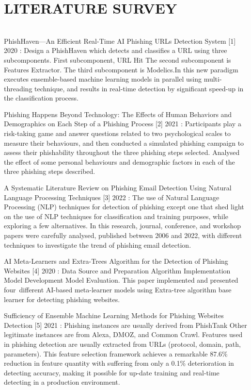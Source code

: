\chapter{LITERATURE SURVEY}
\thispagestyle{empty}
\\
\hspace{.2cm} PhishHaven—An Efficient Real-Time AI Phishing URLs Detection System
[1] 2020 : Design a PhishHaven which detects and classifies a URL using three subcomponents.
First subcomponent, URL Hit 
The second subcomponent is Features Extractor.
The third subcomponent is Modelics.In this new paradigm executes ensemble-based machine learning models in parallel using multi-threading technique, and results in real-time detection by significant speed-up in the classification process. 

\hspace{.2cm} Phishing Happens Beyond Technology: The Effects of Human Behaviors and Demographics on Each Step of a Phishing Process
[2] 2021 : Participants play a risk-taking game and answer questions related to two psychological scales to measure their behaviours, and then conducted a simulated phishing campaign to assess their phishability throughout the three phishing steps selected. Analysed the effect of some personal behaviours and demographic factors in each of the three phishing steps described. 

\hspace{.2cm} A Systematic Literature Review on Phishing Email Detection Using Natural Language Processing Techniques
[3] 2022 : The use of Natural Language Processing (NLP) techniques for detection of phishing except one that shed light on the use of NLP techniques for classification and training purposes, while exploring a few alternatives. In this research, journal, conference, and workshop papers were carefully analysed, published between 2006 and 2022, with different techniques to investigate the trend of phishing email detection.

\hspace{.2cm} AI Meta-Learners and Extra-Trees Algorithm for the Detection of Phishing Websites
[4] 2020 : Data Source and Preparation Algorithm Implementation
Model Development
Model Evaluation. This paper implemented and presented four different AI-based meta-learner models using Extra-tree algorithm base learner for detecting phishing websites. 

\hspace{.2cm} Sufficiency of Ensemble Machine Learning Methods for Phishing Websites Detection
[5] 2021 : Phishing instances are usually derived from PhishTank
Other legitimate instances are from Alexa, DMOZ, and Common Crawl.
Features used in phishing detection are usually extracted from URLs (protocol, domain, path, parameters). This feature selection framework achieves a remarkable 87.6\% reduction in feature quantity with suffering from only a 0.1\% deterioration in detecting accuracy, making it possible for up-date training and real-time detecting in a production environment.

